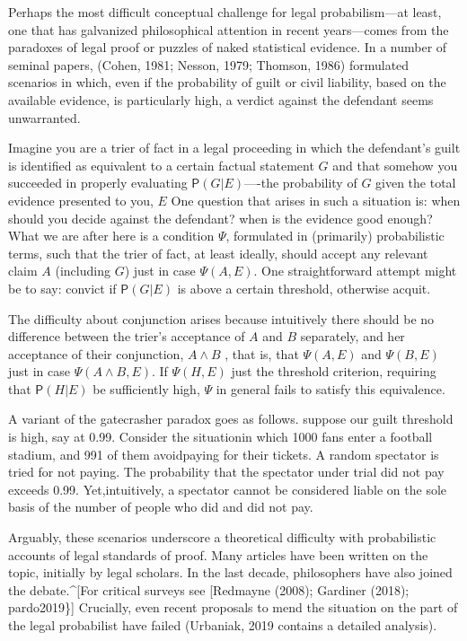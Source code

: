 \documentclass[11pt,dvipsnames,enabledeprecatedfontcommands]{scrartcl}
\newcommand{\pr}[1]{\mathsf{P}(#1)}
\begin{document}
Perhaps the most difficult conceptual challenge for legal
probabilism---at least, one that has galvanized philosophical attention
in recent years---comes from the paradoxes of legal proof or puzzles of
naked statistical evidence. In a number of seminal papers, (Cohen, 1981;
Nesson, 1979; Thomson, 1986) formulated scenarios in which, even if the
probability of guilt or civil liability, based on the available
evidence, is particularly high, a verdict against the defendant seems
unwarranted.

Imagine you are a trier of fact in a legal proceeding in which the
defendant's guilt is identified as equivalent to a certain factual
statement \(G\) and that somehow you succeeded in properly evaluating
\(\pr{G\vert E}\)----the probability of \(G\) given the total evidence
presented to you, \(E\) One question that arises in such a situation is:
when should you decide against the defendant? when is the evidence good
enough? What we are after here is a condition \(\Psi\), formulated in
(primarily) probabilistic terms, such that the trier of fact, at least
ideally, should accept any relevant claim \(A\) (including \(G\)) just
in case \(\Psi(A, E)\). One straightforward attempt might be to say:
convict if \(\pr{G\vert E}\) is above a certain threshold, otherwise
acquit.

The difficulty about conjunction arises because intuitively there should
be no difference between the trier's acceptance of \(A\) and \(B\)
separately, and her acceptance of their conjunction, \(A\wedge B\) ,
that is, that \(\Psi(A,E)\) and \(\Psi(B,E)\) just in case
\(\Psi(A\wedge B, E)\). If \(\Psi(H,E)\) just the threshold criterion,
requiring that \(\pr{H\vert E}\) be sufficiently high, \(\Psi\) in
general fails to satisfy this equivalence.

A variant of the gatecrasher paradox goes as follows. suppose our guilt
threshold is high, say at 0.99. Consider the situationin which 1000 fans
enter a football stadium, and 991 of them avoidpaying for their tickets.
A random spectator is tried for not paying. The probability that the
spectator under trial did not pay exceeds 0.99. Yet,intuitively, a
spectator cannot be considered liable on the sole basis of the number of
people who did and did not pay.

Arguably, these scenarios underscore a theoretical difficulty with
probabilistic accounts of legal standards of proof. Many articles have
been written on the topic, initially by legal scholars. In the last
decade, philosophers have also joined the debate.\^{}{[}For critical
surveys see {[}Redmayne (2008); Gardiner (2018); pardo2019\}{]}
Crucially, even recent proposals to mend the situation on the part of
the legal probabilist have failed (Urbaniak, 2019 contains a detailed
analysis).
\end{document}
